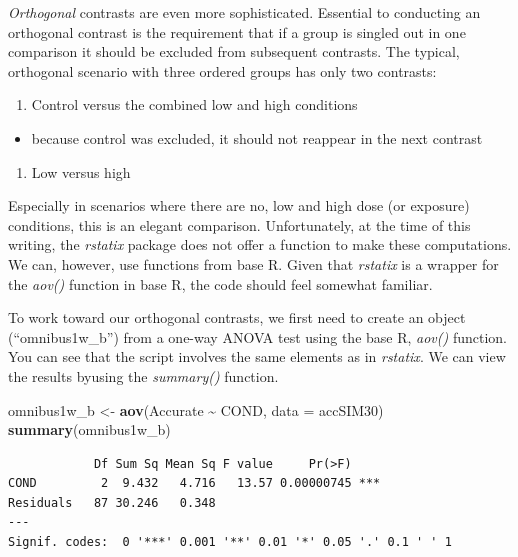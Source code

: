 \documentclass[
  11pt,
]{book}
\newenvironment{Shaded}{\begin{snugshade}}{\end{snugshade}}
\newcommand{\AttributeTok}[1]{\textcolor[rgb]{0.27,0.27,0.27}{#1}}
\newcommand{\FunctionTok}[1]{\textcolor[rgb]{0.27,0.27,0.27}{\textbf{#1}}}
\newcommand{\NormalTok}[1]{#1}
\newcommand{\OtherTok}[1]{\textcolor[rgb]{0.37,0.37,0.37}{#1}}
\newcommand{\SpecialCharTok}[1]{\textcolor[rgb]{0.43,0.43,0.43}{\textbf{#1}}}
\providecommand{\tightlist}{%
  \setlength{\itemsep}{0pt}\setlength{\parskip}{0pt}}
\begin{document}
\emph{Orthogonal} contrasts are even more sophisticated. Essential to conducting an orthogonal contrast is the requirement that if a group is singled out in one comparison it should be excluded from subsequent contrasts. The typical, orthogonal scenario with three ordered groups has only two contrasts:

\begin{enumerate}
\def\labelenumi{\arabic{enumi}.}
\tightlist
\item
  Control versus the combined low and high conditions
\end{enumerate}

\begin{itemize}
\tightlist
\item
  because control was excluded, it should not reappear in the next contrast
\end{itemize}

\begin{enumerate}
\def\labelenumi{\arabic{enumi}.}
\setcounter{enumi}{1}
\tightlist
\item
  Low versus high
\end{enumerate}

Especially in scenarios where there are no, low and high dose (or exposure) conditions, this is an elegant comparison. Unfortunately, at the time of this writing, the \emph{rstatix} package does not offer a function to make these computations. We can, however, use functions from base R. Given that \emph{rstatix} is a wrapper for the \emph{aov()} function in base R, the code should feel somewhat familiar.

To work toward our orthogonal contrasts, we first need to create an object (``omnibus1w\_b'') from a one-way ANOVA test using the base R, \emph{aov()} function. You can see that the script involves the same elements as in \emph{rstatix}. We can view the results byusing the \emph{summary()} function.

\begin{Shaded}
\begin{Highlighting}[]
\NormalTok{omnibus1w\_b }\OtherTok{\textless{}{-}} \FunctionTok{aov}\NormalTok{(Accurate }\SpecialCharTok{\textasciitilde{}}\NormalTok{ COND, }\AttributeTok{data =}\NormalTok{ accSIM30)}
\FunctionTok{summary}\NormalTok{(omnibus1w\_b)}
\end{Highlighting}
\end{Shaded}

\begin{verbatim}
            Df Sum Sq Mean Sq F value     Pr(>F)    
COND         2  9.432   4.716   13.57 0.00000745 ***
Residuals   87 30.246   0.348                       
---
Signif. codes:  0 '***' 0.001 '**' 0.01 '*' 0.05 '.' 0.1 ' ' 1
\end{verbatim}
\end{document}
